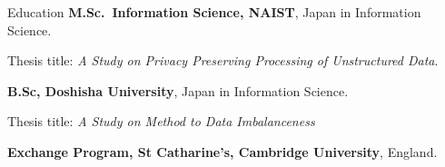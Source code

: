 \begin{rubric}{Education}
\entry*[2020 -- 2022]%
	\textbf{M.Sc.~Information Science, NAIST}, Japan in Information Science.\par
	Thesis title: \emph{A Study on Privacy Preserving Processing of Unstructured Data}.
	
\entry*[2016 -- 2020]%
	\textbf{B.Sc, Doshisha University}, Japan in Information Science.
	\par Thesis title: \emph{A Study on Method to Data Imbalanceness}
	
%
	\textbf{Exchange Program, St Catharine's, Cambridge University}, England.

\end{rubric}